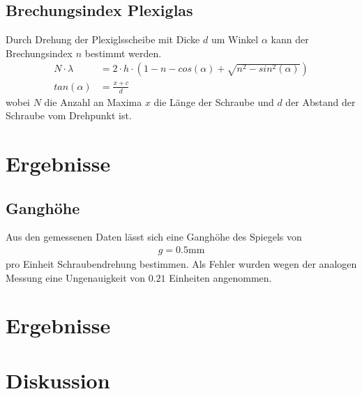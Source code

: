 \documentclass[11pt, a4paper]{article}
\begin{document}
    \subsection{Brechungsindex Plexiglas}
    Durch Drehung der Plexiglsscheibe mit Dicke $d$ um Winkel $\alpha$ kann der Brechungsindex $n$ bestimmt werden.
    \begin{align}
        N \cdot \lambda &= 2 \cdot h \cdot \left(1 - n - cos(\alpha) + \sqrt{n^2 - sin^2(\alpha)}\right) \\
        tan(\alpha) &= \frac{x + c}{d}
    \end{align}
    wobei $N$ die Anzahl an Maxima $x$ die Länge der Schraube und $d$ der Abstand der Schraube vom Drehpunkt ist.

    \section{Ergebnisse}
    \subsection{Ganghöhe}

    Aus den gemessenen Daten lässt sich eine Ganghöhe des Spiegels von
    \begin{align}
        g = 0.5 \si{\milli\metre}
    \end{align}
    pro Einheit Schraubendrehung bestimmen. Als Fehler wurden wegen der analogen Messung eine Ungenauigkeit von $0.21$ Einheiten angenommen.     




    \section{Ergebnisse}

    \section{Diskussion}

    
    
\end{document}
